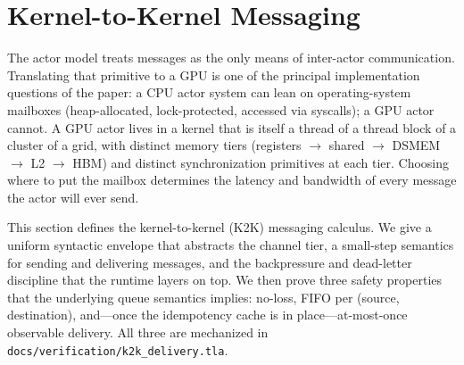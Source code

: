 \section{Kernel-to-Kernel Messaging}
\label{sec:k2k}

The actor model treats messages as the only means of inter-actor
communication.  Translating that primitive to a GPU is one of the
principal implementation questions of the paper: a CPU actor system
can lean on operating-system mailboxes (heap-allocated,
lock-protected, accessed via syscalls); a GPU actor cannot.  A GPU actor lives in a kernel
that is itself a thread of a thread block of a cluster of a grid, with
distinct memory tiers (registers \(\to\) shared \(\to\) DSMEM \(\to\)
L2 \(\to\) HBM) and distinct synchronization primitives at each tier.
Choosing where to put the mailbox determines the latency and
bandwidth of every message the actor will ever send.

This section defines the kernel-to-kernel (K2K) messaging calculus.
We give a uniform syntactic envelope that abstracts the channel tier,
a small-step semantics for sending and delivering messages, and the
backpressure and dead-letter discipline that the runtime layers on
top.  We then prove three safety properties that the underlying
queue semantics implies: no-loss, FIFO per (source,\,destination),
and—once the idempotency cache is in place—at-most-once observable
delivery.  All three are mechanized in
\texttt{docs/verification/k2k\_delivery.tla}.

